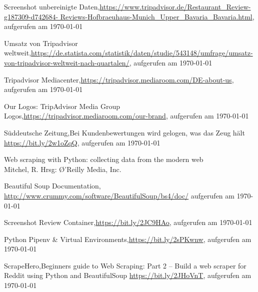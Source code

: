 \documentclass[a4paper,oneside,12pt]{report}
\begin{document}
\begin{thebibliography}{9}
		 Screenshot unbereinigte Daten,\newline \url{https://www.tripadvisor.de/Restaurant\_Review-g187309-d742684-
		Reviews-Hofbraeuhaus-Munich\_Upper\_Bavaria\_Bavaria.html}, aufgerufen am \today
		
		 Umsatz von Tripadvisor weltweit,\newline \url{https://de.statista.com/statistik/daten/studie/543148/umfrage/umsatz-von-tripadvisor-weltweit-nach-quartalen/}, aufgerufen am \today
		
		 Tripadvisor Mediacenter,\newline \url{https://tripadvisor.mediaroom.com/DE-about-us}, aufgerufen am \today
		
		 Our Logos: TripAdvisor Media Group Logos,\newline \url{https://tripadvisor.mediaroom.com/our-brand}, aufgerufen am \today
		
		 Süddeutsche Zeitung,\newline Bei Kundenbewertungen wird gelogen, was das Zeug hält \newline \url{https://bit.ly/2w1oZqQ}, aufgerufen am \today
		
		 Web scraping with Python: collecting data from the modern web\\ Mitchel, R. Hrsg: \O'Reilly Media, Inc.
		
		 Beautiful Soup Documentation, \newline \url{http://www.crummy.com/software/BeautifulSoup/bs4/doc/} aufgerufen am \today
		
		 Screenshot Review Container,\newline \url{https://bit.ly/2JC9HAo}, aufgerufen am \today
		
		 Python Pipenv \& Virtual Environments,\newline \url{https://bit.ly/2sPKwnw}, aufgerufen am \today
		
		 ScrapeHero,\newline Beginners guide to Web Scraping: Part 2 – Build a web scraper for Reddit using Python and BeautifulSoup \newline \url{https://bit.ly/2JHoVnT}, aufgerufen am \today
		
	\end{thebibliography}
	
\end{document}
